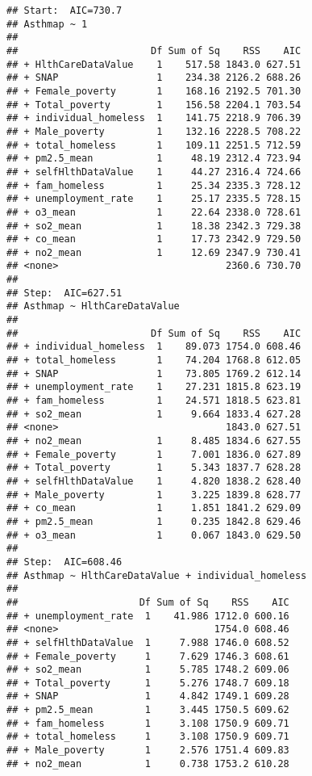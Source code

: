 \documentclass[
]{article}
\begin{document}
\begin{verbatim}
## Start:  AIC=730.7
## Asthmap ~ 1
## 
##                       Df Sum of Sq    RSS    AIC
## + HlthCareDataValue    1    517.58 1843.0 627.51
## + SNAP                 1    234.38 2126.2 688.26
## + Female_poverty       1    168.16 2192.5 701.30
## + Total_poverty        1    156.58 2204.1 703.54
## + individual_homeless  1    141.75 2218.9 706.39
## + Male_poverty         1    132.16 2228.5 708.22
## + total_homeless       1    109.11 2251.5 712.59
## + pm2.5_mean           1     48.19 2312.4 723.94
## + selfHlthDataValue    1     44.27 2316.4 724.66
## + fam_homeless         1     25.34 2335.3 728.12
## + unemployment_rate    1     25.17 2335.5 728.15
## + o3_mean              1     22.64 2338.0 728.61
## + so2_mean             1     18.38 2342.3 729.38
## + co_mean              1     17.73 2342.9 729.50
## + no2_mean             1     12.69 2347.9 730.41
## <none>                             2360.6 730.70
## 
## Step:  AIC=627.51
## Asthmap ~ HlthCareDataValue
## 
##                       Df Sum of Sq    RSS    AIC
## + individual_homeless  1    89.073 1754.0 608.46
## + total_homeless       1    74.204 1768.8 612.05
## + SNAP                 1    73.805 1769.2 612.14
## + unemployment_rate    1    27.231 1815.8 623.19
## + fam_homeless         1    24.571 1818.5 623.81
## + so2_mean             1     9.664 1833.4 627.28
## <none>                             1843.0 627.51
## + no2_mean             1     8.485 1834.6 627.55
## + Female_poverty       1     7.001 1836.0 627.89
## + Total_poverty        1     5.343 1837.7 628.28
## + selfHlthDataValue    1     4.820 1838.2 628.40
## + Male_poverty         1     3.225 1839.8 628.77
## + co_mean              1     1.851 1841.2 629.09
## + pm2.5_mean           1     0.235 1842.8 629.46
## + o3_mean              1     0.067 1843.0 629.50
## 
## Step:  AIC=608.46
## Asthmap ~ HlthCareDataValue + individual_homeless
## 
##                     Df Sum of Sq    RSS    AIC
## + unemployment_rate  1    41.986 1712.0 600.16
## <none>                           1754.0 608.46
## + selfHlthDataValue  1     7.988 1746.0 608.52
## + Female_poverty     1     7.629 1746.3 608.61
## + so2_mean           1     5.785 1748.2 609.06
## + Total_poverty      1     5.276 1748.7 609.18
## + SNAP               1     4.842 1749.1 609.28
## + pm2.5_mean         1     3.445 1750.5 609.62
## + fam_homeless       1     3.108 1750.9 609.71
## + total_homeless     1     3.108 1750.9 609.71
## + Male_poverty       1     2.576 1751.4 609.83
## + no2_mean           1     0.738 1753.2 610.28

\end{verbatim}
\end{document}
